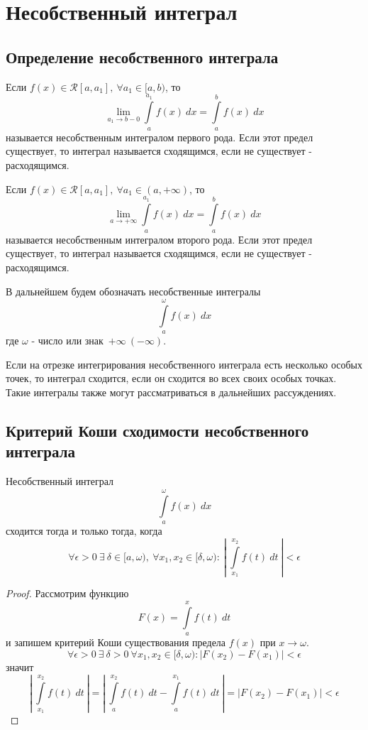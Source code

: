 \newpage
\section{Несобственный интеграл}
\subsection{Определение несобственного интеграла}
\begin{definition}
    Если $f(x)\in \mathcal{R}[a,a_1],\ \forall a_1\in [a,b)$, то 
    \[\lim\limits_{a_1\to b-0}\int\limits_{a}^{a_1}f(x)\ dx=\int\limits_{a}^{b}f(x)\ dx\]
    называется несобственным интегралом первого рода.
    Если этот предел существует, то интеграл называется сходящимся, если не существует - расходящимся. 
\end{definition} 
\begin{definition}
    Если $f(x)\in \mathcal{R}[a,a_1],\ \forall a_1\in (a, +\infty)$, то
    \[\lim\limits_{a\to +\infty} \int\limits_{a}^{a_1}f(x)\ dx=\int\limits_{a}^{b}f(x)\ dx\]
    называется несобственным интегралом второго рода. Если этот предел существует, то интеграл называется сходящимся, если не существует - расходящимся.
\end{definition} 
\begin{comm}
    В дальнейшем будем обозначать несобственные интегралы
    \[\int\limits_{a}^{\omega}f(x)\ dx\]
    где $\omega$ - число или знак\ $+\infty\ (-\infty)$.
\end{comm} 
\begin{comm}
    Если на отрезке интегрирования несобственного интеграла есть несколько особых точек, то интеграл сходится, если он сходится во всех своих особых точках. Такие интегралы также могут рассматриваться в дальнейших рассуждениях.
\end{comm}
\subsection{Критерий Коши сходимости несобственного интеграла}
\begin{theorem}
    Несобственный интеграл
    \[\int\limits_{a}^{\omega}f(x)\ dx\]
    сходится тогда и только тогда, когда
    \[\forall \epsilon>0\ \exists\ \delta\in [a,\omega),\ \forall x_1,x_2\in [\delta, \omega):\ \left|\ \int\limits_{x_1}^{x_2}f(t)\ dt\ \right|<\epsilon\]
\end{theorem} 
\begin{proof}
    Рассмотрим функцию
    \[F(x)=\int\limits_{a}^{x}f(t)\ dt\]
    и запишем критерий Коши существования предела $f(x)$ при $x \to \omega$.
    \[\forall \epsilon>0\ \exists\ \delta>0\ \forall x_1, x_2\in [\delta, \omega): |F(x_2)-F(x_1)|<\epsilon\]
    значит
    \[\left|\ \int\limits_{x_1}^{x_2}f(t)\ dt\ \right|=\left|\ \int\limits_{a}^{x_2}f(t)\ dt-\int\limits_{a}^{x_1}f(t)\ dt\ \right|=|F(x_2)-F(x_1)|<\epsilon\]
\end{proof} 
